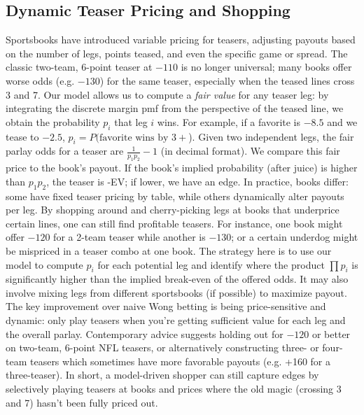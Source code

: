 \documentclass[11pt]{amsart}
\begin{document}
\subsection{Dynamic Teaser Pricing and Shopping}
Sportsbooks have introduced variable pricing for teasers, adjusting payouts based on the number of legs, points teased, and even the specific game or spread. The classic two-team, 6-point teaser at \(-110\) is no longer universal; many books offer worse odds (e.g. \(-130\)) for the same teaser, especially when the teased lines cross 3 and 7. Our model allows us to compute a \textit{fair value} for any teaser leg: by integrating the discrete margin pmf from the perspective of the teased line, we obtain the probability $p_i$ that leg $i$ wins. For example, if a favorite is \(-8.5\) and we tease to \(-2.5\), $p_i = P(\text{favorite wins by }3+$). Given two independent legs, the fair parlay odds for a teaser are $\frac{1}{p_1 p_2} - 1$ (in decimal format). We compare this fair price to the book’s payout. If the book’s implied probability (after juice) is higher than $p_1 p_2$, the teaser is -EV; if lower, we have an edge. In practice, books differ: some have fixed teaser pricing by table, while others dynamically alter payouts per leg. By shopping around and cherry-picking legs at books that underprice certain lines, one can still find profitable teasers. For instance, one book might offer \(-120\) for a 2-team teaser while another is \(-130\); or a certain underdog might be mispriced in a teaser combo at one book. The strategy here is to use our model to compute $p_i$ for each potential leg and identify where the product $\prod p_i$ is significantly higher than the implied break-even of the offered odds. It may also involve mixing legs from different sportsbooks (if possible) to maximize payout. The key improvement over naive Wong betting is being price-sensitive and dynamic: only play teasers when you’re getting sufficient value for each leg and the overall parlay. Contemporary advice suggests holding out for \(-120\) or better on two-team, 6-point NFL teasers, or alternatively constructing three- or four-team teasers which sometimes have more favorable payouts (e.g. +160 for a three-teaser). In short, a model-driven shopper can still capture edges by selectively playing teasers at books and prices where the old magic (crossing 3 and 7) hasn’t been fully priced out.
\end{document}
